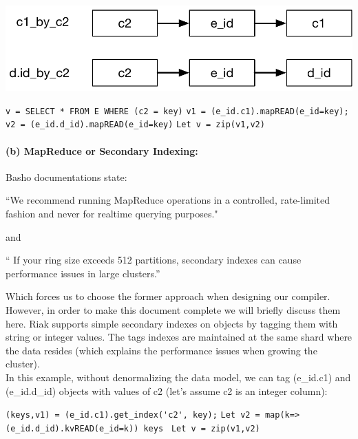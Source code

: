 \documentclass[12pt]{article}
\begin{document}
\begin{enumerate}
\begin{center}
\includegraphics[scale=0.42]{den_obj.pdf}
\end{center}
	 \hspace{5mm}\lstinline[basicstyle=\ttfamily ] 
		{v = SELECT * FROM E WHERE (c2 = key)}
	 \hspace{8.5mm}\lstinline[basicstyle=\ttfamily ]                        
                {v1 = (e_id.c1).mapREAD(e_id=key);}
	\subitem \hspace{18.6mm}\lstinline[basicstyle=\ttfamily ]                        
                {v2 = (e_id.d_id).mapREAD(e_id=key)}
	\subitem \hspace{18.6mm}\lstinline[basicstyle=\ttfamily ]                        
		{Let v = zip(v1,v2)}

\paragraph{(b) MapReduce or Secondary Indexing:}
Basho documentations state:
\begin{displayquote}
``We recommend running MapReduce operations in a controlled,
rate-limited fashion and never for realtime querying purposes."
\end{displayquote}
and
\begin{displayquote}
`` If your ring size exceeds 512 partitions, secondary indexes can cause performance
issues in large clusters.''
\end{displayquote}
Which forces us to choose the former approach when designing our compiler.
However, in order to make this document complete we will briefly discuss
them here.
Riak supports simple secondary indexes on objects by tagging them with string or
integer values. The tags indexes are maintained at the same shard where
the data resides (which explains the performance issues when growing the
cluster).
\\ In this example, without denormalizing the data model, we can tag (e\_id.c1) and (e\_id.d\_id) objects
with values of c2 (let's assume c2 is an integer column):

	 \hspace{7.9mm}\lstinline[basicstyle=\ttfamily ]                        
	{(keys,v1) = (e_id.c1).get_index('c2', key);}
	\subitem \hspace{18.6mm}\lstinline[basicstyle=\ttfamily ]                        
	{Let v2 = map(k=>(e_id.d_id).kvREAD(e_id=k)) keys }
        \subitem \hspace{18.6mm}\lstinline[basicstyle=\ttfamily ]
	                {Let v = zip(v1,v2)}


\end{enumerate}
\end{document}
